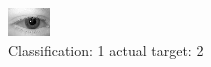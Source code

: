 \begin{figure}[h!]
\begin{center}
\includegraphics[width=0.60\columnwidth]{figures/ID418_class_1_target_2.png}
\end{center}
\caption{ Classification: 1 actual target: 2}
\label{fig:ID418_class_1_target_2}
\end{figure}
